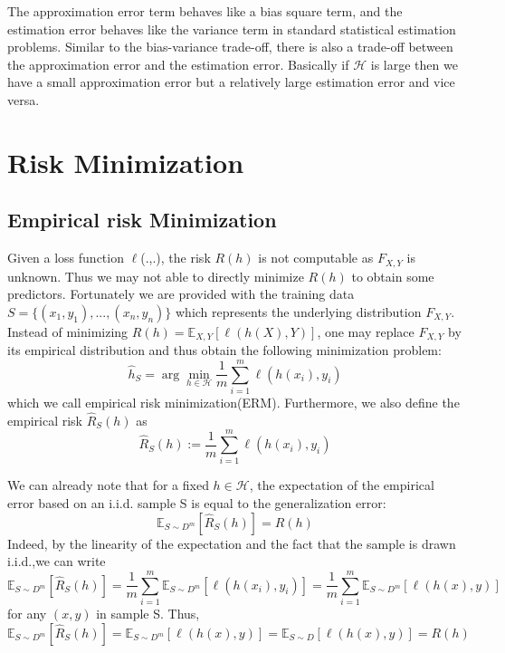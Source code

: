 \noindent The approximation error term behaves like a bias square term, and the estimation error behaves like the variance term in standard statistical estimation problems. Similar to the bias-variance trade-off, there is also a trade-off between the approximation error and the estimation error. Basically if $\mathcal{H}$ is large then we have a small approximation error but a relatively large estimation error and vice versa.

\section{Risk Minimization}
\subsection{Empirical risk Minimization}
Given a loss function $\ell$(.,.), the risk $R(h)$ is not computable as $F_{X,Y}$ is unknown. Thus we may not able to directly minimize $R(h)$ to obtain some predictors. Fortunately we are provided with the training data
$S=\{(x_1,y_1),...,(x_n, y_n)\}$ which represents the underlying distribution $F_{X,Y}$.
Instead of minimizing $R(h)=\mathbb{E}_{X,Y}[\ell(h(X),Y)]$, one may replace $F_{X,Y}$ by its empirical distribution and thus obtain the following minimization problem:
\begin{equation}
\hat{h}_S = \arg\min_{h \in \mathcal{H}} \frac{1}{m} \sum_{i=1}^{m}{\ell(h(x_i),y_i)}
\end{equation}
which we call empirical risk minimization(ERM). Furthermore, we also define the empirical risk $\hat{R}_S(h)$ as
\begin{equation}
\hat{R}_S(h):= \frac{1}{m} \sum_{i=1}^{m}{\ell(h(x_i),y_i)}
\end{equation}

\noindent We can already note that for a fixed $h \in \mathcal{H}$, the expectation of the empirical error based on an i.i.d. sample S is equal to the generalization error:
\begin{equation}
\mathbb{E}_{S\sim {D^m}}[\hat{R}_S(h)]=R(h)
\end{equation}
Indeed, by the linearity of the expectation and the fact that the sample is drawn i.i.d.,we can write
\begin{equation}
\mathbb{E}_{S\sim {D^m}}[\hat{R}_S(h)] = \frac{1}{m}\sum_{i=1}^{m}\mathbb{E}_{S\sim {D^m}}[{\ell(h(x_i),y_i)}] = \frac{1}{m}\sum_{i=1}^{m}\mathbb{E}_{S\sim{D^m}}[{\ell(h(x),y)}]
\end{equation}
for any $(x,y)$ in sample S. Thus,
\begin{equation}
\mathbb{E}_{S\sim {D^m}}[\hat{R}_S(h)] = \mathbb{E}_{S\sim{D^m}}[{\ell(h(x),y)}]= \mathbb{E}_{S\sim{D}}[{\ell(h(x),y)}]=R(h)
\end{equation}


